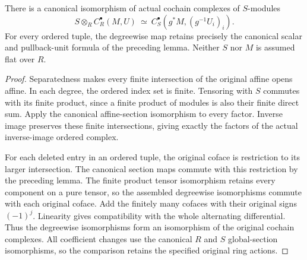 \begin{theorem}
\label{thm:kn-geometric-cech-base-change}
\leanok
{}
There is a canonical isomorphism of actual cochain complexes of
$S$-modules
\[
 S\otimes_R C_R^\bullet(M,U)\ \simeq\
 C_S^\bullet(g^*M,(g^{-1}U_i)_i).
\]
For every ordered tuple, the degreewise map retains precisely the
canonical scalar and pullback-unit formula of the preceding lemma.
Neither $S$ nor $M$ is assumed flat over $R$.
\end{theorem}
\begin{proof}
Separatedness makes every finite intersection of the original affine
opens affine.  In each degree, the ordered index set is finite.
Tensoring with $S$ commutes with its finite product, since a finite
product of modules is also their finite direct sum.  Apply the
canonical affine-section isomorphism to every factor.  Inverse image
preserves these finite intersections, giving exactly the factors of
the actual inverse-image ordered complex.

For each deleted entry in an ordered tuple, the original coface is
restriction to its larger intersection.  The canonical section maps
commute with this restriction by the preceding lemma.  The finite
product tensor isomorphism retains every component on a pure tensor,
so the assembled degreewise isomorphisms commute with each original
coface.  Add the finitely many cofaces with their original signs
$(-1)^j$.  Linearity gives compatibility with the whole alternating
differential.  Thus the degreewise isomorphisms form an isomorphism of
the original cochain complexes.  All coefficient changes use the
canonical $R$ and $S$ global-section isomorphisms, so the comparison
retains the specified original ring actions.
\end{proof}
